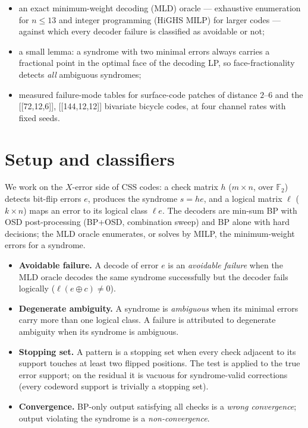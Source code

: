 \documentclass[10pt]{article}
\begin{document}
\begin{itemize}
\item an exact minimum-weight decoding (MLD) oracle --- exhaustive
  enumeration for $n \le 13$ and integer programming (HiGHS MILP) for
  larger codes --- against which every decoder failure is classified as
  avoidable or not;
\item a small lemma: a syndrome with two minimal errors always carries
  a fractional point in the optimal face of the decoding LP, so
  face-fractionality detects \emph{all} ambiguous syndromes;
\item measured failure-mode tables for surface-code patches of distance
  $2$--$6$ and the [[72,12,6]], [[144,12,12]] bivariate bicycle codes,
  at four channel rates with fixed seeds.
\end{itemize}

\section{Setup and classifiers}

We work on the $X$-error side of CSS codes: a check matrix $h$ ($m
\times n$, over $\mathbb{F}_2$) detects bit-flip errors $e$, produces
the syndrome $s = h e$, and a logical matrix $\ell$ ($k \times n$) maps
an error to its logical class $\ell e$. The decoders are min-sum BP
with OSD post-processing (BP+OSD, combination sweep) and BP alone with
hard decisions; the MLD oracle enumerates, or solves by MILP, the
minimum-weight errors for a syndrome.

\begin{itemize}
\item \textbf{Avoidable failure.} A decode of error $e$ is an
  \emph{avoidable failure} when the MLD oracle decodes the same
  syndrome successfully but the decoder fails logically
  ($\ell(e \oplus c) \neq 0$).
\item \textbf{Degenerate ambiguity.} A syndrome is
  \emph{ambiguous} when its minimal errors carry more than one logical
  class. A failure is attributed to degenerate ambiguity when its
  syndrome is ambiguous.
\item \textbf{Stopping set.} A pattern is a stopping set when every
  check adjacent to its support touches at least two flipped positions.
  The test is applied to the true error support; on the residual it is
  vacuous for syndrome-valid corrections (every codeword support is
  trivially a stopping set).
\item \textbf{Convergence.} BP-only output satisfying all checks is a
  \emph{wrong convergence}; output violating the syndrome is a
  \emph{non-convergence}.
\end{itemize}
\end{document}

